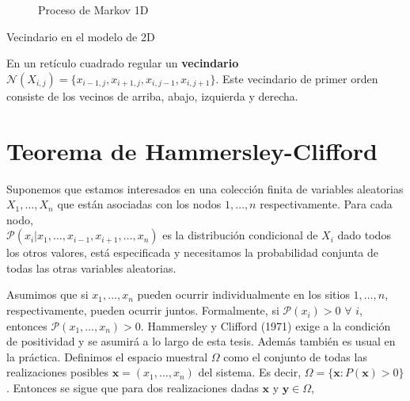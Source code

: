 \begin{figure}[Reticulo]
    \centering
    \caption{Proceso de Markov 1D}
    \label{fig:Markov1D}
\end{figure}

    
\begin{definition}{Vecindario en el modelo de 2D}

En un retículo cuadrado regular un \textbf{vecindario} $\mathcal{N}(X_{i,j}) = \{x_{i-1,j},x_{i+1,j},x_{i,j-1},x_{i,j+1}\}$. Este vecindario de primer orden consiste de los vecinos de arriba, abajo, izquierda y derecha. 
    
\end{definition}



\section{Teorema de Hammersley-Clifford}

Suponemos que estamos interesados en una colección finita de variables aleatorias $X_1, \dots ,X_n$ que están asociadas con los nodos $1,\dots,n$ respectivamente. Para cada nodo, \\ $\mathcal{P}(x_i|x_1,\dots,x_{i-1},x_{i+1},\dots,x_n)$ es la distribución condicional de $X_i$ dado todos los otros valores, está especificada y necesitamos la probabilidad conjunta de todas las otras variables aleatorias.

Asumimos que si $x_1,\dots,x_n$ pueden ocurrir individualmente en los sitios $1,\dots,n$, respectivamente, pueden ocurrir juntos. Formalmente, si $\mathcal{P}(x_i) > 0$  $\forall$  $i $, entonces $\mathcal{P}(x_1, \dots, x_n) > 0$. Hammersley y Clifford (1971) exige a la condición de positividad  y se asumirá a lo largo de esta tesis. Además también es usual en la práctica. Definimos el espacio muestral $\Omega$ como el conjunto de todas las realizaciones posibles $\mathbf { x } = (x_1, ..., x_n)$ del sistema. Es decir, $\Omega = \{\mathbf { x }: P (\mathbf { x })> 0\}$. Entonces se sigue que para dos realizaciones dadas $\mathbf { x }$ y $\mathbf { y } \in \Omega$,



